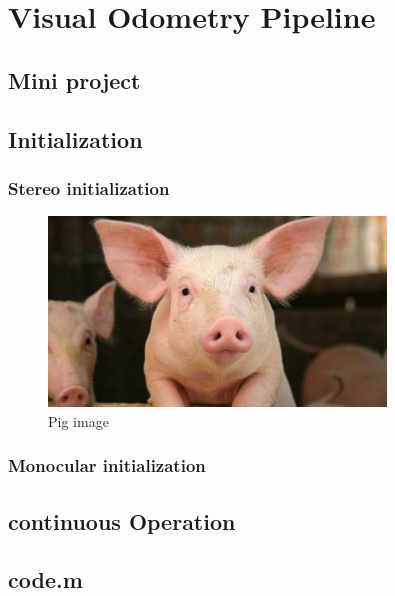 \documentclass[a4paper,10pt]{article} %
\begin{document}
\section{Visual Odometry Pipeline}
\subsection{Mini project}


\subsection{Initialization}
\subsubsection{Stereo initialization}
\begin{figure}[ht]
	\includegraphics[width=0.8\textwidth]{pig}
	\caption{Pig image}
	\label{img_pig}
\end{figure}

\subsubsection{Monocular initialization}



\subsection{continuous Operation}



\newpage
\subsection*{code.m}
%
\end{document}
